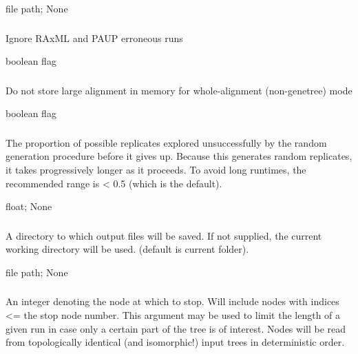 \documentclass[letterpaper,12pt,english]{sphinxmanual}
\begin{document}
 file path;  None


\subsubsection{}
\label{\detokenize{prog_desc:ignore-errors}}
 Ignore RAxML and PAUP erroneous runs

 boolean flag


\subsubsection{}
\label{\detokenize{prog_desc:low-mem}}
 Do not store large alignment in memory for whole-alignment (non-genetree) mode

 boolean flag


\subsubsection{}
\label{\detokenize{prog_desc:max-random-sample-proportion}}
 The proportion of possible replicates explored unsuccessfully by the random generation procedure before it gives up. Because this generates random replicates, it takes progressively longer as it proceeds. To avoid long runtimes, the recommended range is \textless{} 0.5 (which is the default).

 float;  None


\subsubsection{}
\label{\detokenize{prog_desc:o-results-dir}}
 A directory to which output files will be saved. If not supplied, the current working directory will be used. (default is current folder).

 file path;  None


\subsubsection{}
\label{\detokenize{prog_desc:p-stop-node-number}}
 An integer denoting the node at which to stop. Will include nodes with indices \textless{}= the stop node number. This argument may be used to limit the length of a given run in case only a certain part of the tree is of interest. Nodes will be read from topologically identical (and isomorphic!) input trees in deterministic order.
\end{document}
